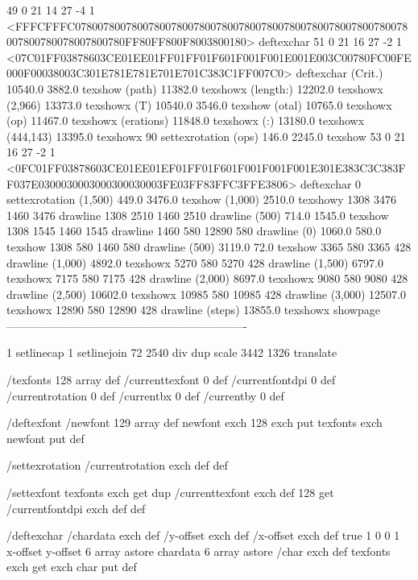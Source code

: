 49 0 21 14 27 -4 1 {{<FFFCFFFC07800780078007800780078007800780078007800780078007800780078007800780078007800780FF80FF800F8003800180>}} deftexchar
51 0 21 16 27 -2 1 {{<07C01FF03878603CE01EE01FF01FF01F601F001F001E001E003C00780FC00FE000F00038003C301E781E781E701E701C383C1FF007C0>}} deftexchar
(Crit.) 10540.0 3882.0 texshow
(path) 11382.0 texshowx
(length:) 12202.0 texshowx
(2,966) 13373.0 texshowx
(T) 10540.0 3546.0 texshow
(otal) 10765.0 texshowx
(op) 11467.0 texshowx
(erations) 11848.0 texshowx
(:) 13180.0 texshowx
(444,143) 13395.0 texshowx
90 settexrotation
(ops) 146.0 2245.0 texshow
53 0 21 16 27 -2 1 {{<0FC01FF03878603CE01EE01EF01FF01F601F001F001F001E301E383C3C383FF037E0300030003000300030003FE03FF83FFC3FFE3806>}} deftexchar
0 settexrotation
(1,500) 449.0 3476.0 texshow
(1,000) 2510.0 texshowy
1308 3476 1460 3476 drawline
1308 2510 1460 2510 drawline
(500) 714.0 1545.0 texshow
1308 1545 1460 1545 drawline
1460 580 12890 580 drawline
(0) 1060.0 580.0 texshow
1308 580 1460 580 drawline
(500) 3119.0 72.0 texshow
3365 580 3365 428 drawline
(1,000) 4892.0 texshowx
5270 580 5270 428 drawline
(1,500) 6797.0 texshowx
7175 580 7175 428 drawline
(2,000) 8697.0 texshowx
9080 580 9080 428 drawline
(2,500) 10602.0 texshowx
10985 580 10985 428 drawline
(3,000) 12507.0 texshowx
12890 580 12890 428 drawline
(steps) 13855.0 texshowx
showpage
----------------------------------------------------------------

1 setlinecap 1 setlinejoin
72 2540 div dup scale
3442 1326 translate



/texfonts 128 array def
/currenttexfont 0 def
/currentfontdpi 0 def
/currentrotation 0 def
/currentbx 0 def
/currentby 0 def

/deftexfont
 { /newfont 129 array def
   newfont exch 128 exch put
   texfonts exch newfont put } def

/settexrotation
 { /currentrotation exch def } def

/settexfont
 { texfonts exch get dup /currenttexfont exch def
   128 get /currentfontdpi exch def } def

/deftexchar
 { /chardata exch def
   /y-offset exch def
   /x-offset exch def
   true
   1 0 0 1 x-offset y-offset 6 array astore
   chardata
   6 array astore /char exch def
   texfonts exch get exch char put } def

